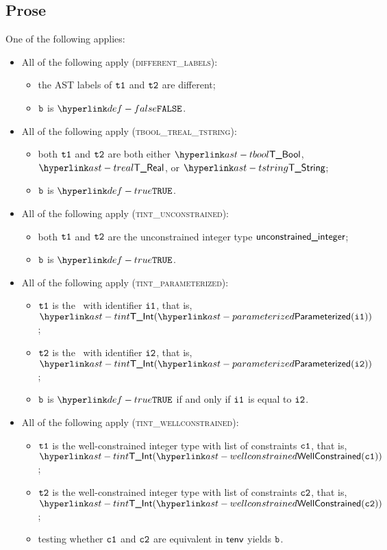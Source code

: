 \subsection{Prose}
One of the following applies:
\begin{itemize}
  \item All of the following apply (\textsc{different\_labels}):
  \begin{itemize}
    \item the AST labels of $\texttt{t1}$ and $\texttt{t2}$ are different;
    \item $\texttt{b}$ is $\False$.
  \end{itemize}

  \item All of the following apply (\textsc{tbool\_treal\_tstring}):
  \begin{itemize}
    \item both $\texttt{t1}$ and $\texttt{t2}$ are both either $\TBool$, $\TReal$, or $\TString$;
    \item $\texttt{b}$ is $\True$.
  \end{itemize}

  \item All of the following apply (\textsc{tint\_unconstrained}):
  \begin{itemize}
    \item both $\texttt{t1}$ and $\texttt{t2}$ are the unconstrained integer type $\textsf{unconstrained\_integer}$;
    \item $\texttt{b}$ is $\True$.
  \end{itemize}

  \item All of the following apply (\textsc{tint\_parameterized}):
  \begin{itemize}
    \item $\texttt{t1}$ is the \parameterizedintegertype\  with identifier $\texttt{i1}$, that is, \\ $\TInt(\parameterized(\vione))$;
    \item $\texttt{t2}$ is the \parameterizedintegertype\ with identifier $\texttt{i2}$, that is, \\ $\TInt(\parameterized(\vitwo))$;
    \item $\texttt{b}$ is $\True$ if and only if $\texttt{i1}$ is equal to $\texttt{i2}$.
  \end{itemize}

  \item All of the following apply (\textsc{tint\_wellconstrained}):
  \begin{itemize}
    \item $\texttt{t1}$ is the well-constrained integer type with list of constraints $\texttt{c1}$, that is, \\ $\TInt(\wellconstrained(\vcone))$;
    \item $\texttt{t2}$ is the well-constrained integer type with list of constraints $\texttt{c2}$, that is, \\ $\TInt(\wellconstrained(\vctwo))$;
    \item testing whether $\texttt{c1}$ and $\texttt{c2}$ are equivalent in $\textsf{tenv}$ yields $\texttt{b}$\ProseOrTypeError.
  \end{itemize}


\end{itemize}
